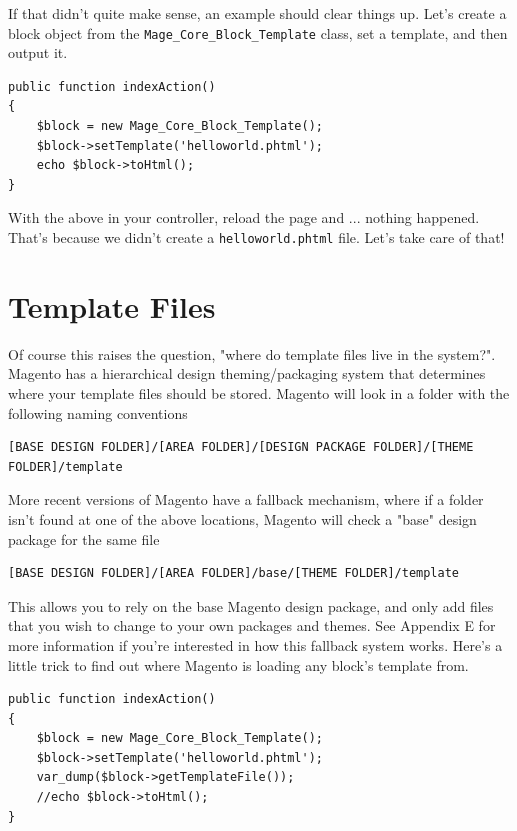 \documentclass[oneside]{book}
\begin{document}
If that didn't quite make sense, an example should clear things up.  Let's create a block object from the \footnotesize\texttt{Mage\_Core\_Block\_Template} \normalsize  class, set a template, and then output it.

\begin{lstlisting}
public function indexAction()
{
    $block = new Mage_Core_Block_Template();
    $block->setTemplate('helloworld.phtml');
    echo $block->toHtml();  
}

\end{lstlisting}


With the above in your controller, reload the page and ... nothing happened.  That's because we didn't create a \footnotesize\texttt{helloworld.phtml} \normalsize  file.  Let's take care of that!

\section{Template Files}

Of course this raises the question, "where do template files live in the system?".  Magento has a hierarchical design theming/packaging system that determines where your template files should be stored.  Magento will look in a folder with the following naming conventions

\begin{lstlisting}
[BASE DESIGN FOLDER]/[AREA FOLDER]/[DESIGN PACKAGE FOLDER]/[THEME FOLDER]/template

\end{lstlisting}


More recent versions of Magento have a fallback mechanism, where if a folder isn't found at one of the above locations, Magento will check a "base" design package for the same file

\begin{lstlisting}
[BASE DESIGN FOLDER]/[AREA FOLDER]/base/[THEME FOLDER]/template

\end{lstlisting}


This allows you to rely on the base Magento design package, and only add files that you wish to change to your own packages and themes.  See Appendix E for more information if you're interested in how this fallback system works.  Here's a little trick to find out where Magento is loading any block's template from.  

\begin{lstlisting}
public function indexAction()
{
    $block = new Mage_Core_Block_Template();
    $block->setTemplate('helloworld.phtml');
    var_dump($block->getTemplateFile());
    //echo $block->toHtml();    
}

\end{lstlisting}
\end{document}
